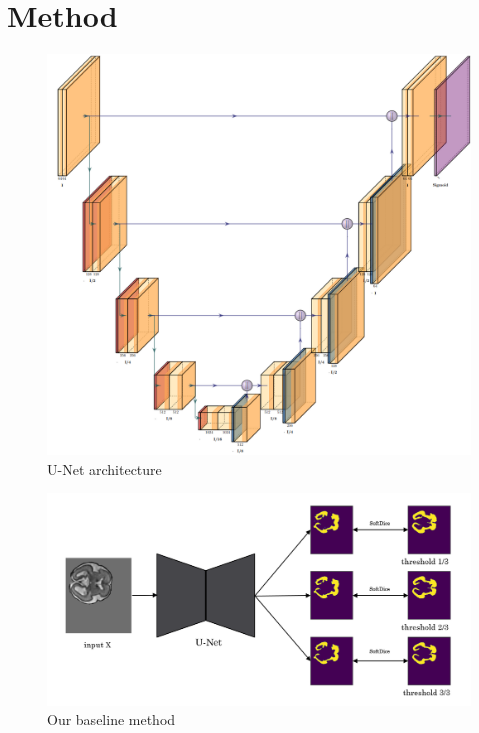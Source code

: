 \documentclass[12pt]{extarticle}
\begin{document}
\section{Method}
\begin{figure}[hb!]
\centering
\includegraphics[scale=0.28]{fig2.png}
\caption{U-Net architecture\cite{iqbal_2018}}
\label{pre_results}
\end{figure}
\begin{figure}[ht!]
\centering
\includegraphics[scale=0.3]{fig3.png}
\caption{Our baseline method}
\label{proposed_mothod}
\end{figure}
\end{document}
